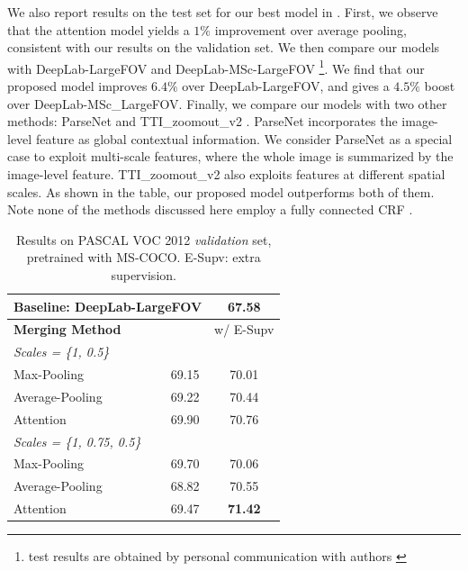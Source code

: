 We also report results on the test set for our best model in . First, we observe that the attention model yields a $1\%$ improvement over average pooling, consistent with our results on the validation set. We then compare our models with DeepLab-LargeFOV and DeepLab-MSc-LargeFOV \cite{chen2014semantic} \footnote{test results are obtained by personal communication with authors \cite{chen2014semantic}}. We find that our proposed model improves $6.4\%$ over DeepLab-LargeFOV, and gives a $4.5\%$ boost over DeepLab-MSc\_LargeFOV. Finally, we compare our models with two other methods: ParseNet \cite{liu2015parsenet} and TTI\_zoomout\_v2 \cite{mostajabi2014feedforward}. ParseNet incorporates the image-level feature as global contextual information. We consider ParseNet as a special case to exploit multi-scale features, where the whole image is summarized by the image-level feature. TTI\_zoomout\_v2 also exploits features at different spatial scales. As shown in the table, our proposed model outperforms both of them. Note none of the methods discussed here employ a fully connected CRF \cite{KrahenbuhlK11}.

\begin{table}
  \centering
  \addtolength{\tabcolsep}{2.5pt}
    \begin{tabular}{l c c}
      \toprule[0.2 em]
      \multicolumn{2}{l}{Baseline: DeepLab-LargeFOV} & 67.58  \\
      \toprule[0.2 em]
      {\bf Merging Method} &  & w/ E-Supv \\
      \midrule
      \midrule
      {\it Scales = \{1, 0.5\}} & & \\
      Max-Pooling & 69.15 & 70.01 \\
      Average-Pooling & 69.22 & 70.44 \\
      Attention & 69.90 & 70.76 \\
      \midrule
      {\it Scales = \{1, 0.75, 0.5\}} & & \\
      Max-Pooling & 69.70 & 70.06 \\
      Average-Pooling & 68.82 & 70.55 \\
      Attention & 69.47 & {\bf 71.42} \\
      \bottomrule[0.1 em]
    \end{tabular}
    \vspace{1pt}
    \caption{Results on PASCAL VOC 2012 {\it validation} set, pretrained with MS-COCO. E-Supv: extra supervision.}
    \label{tab:deeplab_voc12}
\end{table}

